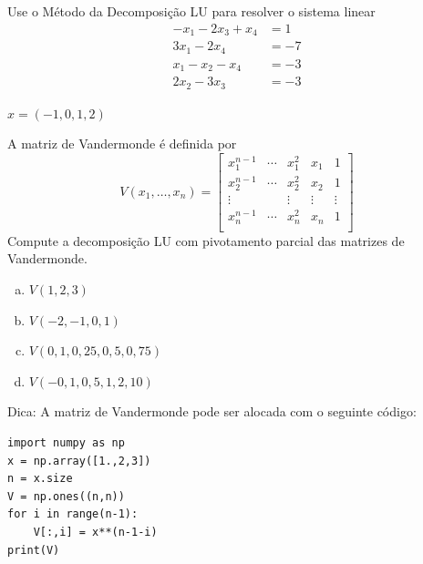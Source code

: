 \begin{exer}
  Use o Método da Decomposição LU para resolver o sistema linear
  \begin{align}
    -x_1 - 2x_3 + x_4 &= 1\\
    3x_1 - 2x_4 &= -7\\
    x_1 - x_2 - x_4 &= -3\\
    2x_2 - 3x_3 &= -3
  \end{align}
\end{exer}
\begin{resp}
  $x = (-1, 0, 1, 2)$
\end{resp}

\begin{exer}
  A matriz de Vandermonde{\vandermonde} é definida por
  \begin{equation}
    V(x_1,\ldots,x_n) =
    \begin{bmatrix}
      x_1^{n-1} & \cdots  & x_1^2 & x_1 & 1\\
      x_2^{n-1} & \cdots  & x_2^2 & x_2 & 1\\
      \vdots   &         & \vdots & \vdots & \vdots\\
      x_n^{n-1} & \cdots  & x_n^2 & x_n & 1\\
    \end{bmatrix}
  \end{equation}
  Compute a decomposição LU com pivotamento parcial das matrizes de Vandermonde.
  \begin{enumerate}[a)]
  \item $V(1,2,3)$\\
  \item $V(-2,-1,0,1)$\\
  \item $V(0,1, 0,25, 0,5, 0,75)$\\
  \item $V(-0,1, 0,5, 1, 2, 10)$
  \end{enumerate}
\end{exer}
\begin{resp}
  Dica: A matriz de Vandermonde pode ser alocada com o seguinte código:
\begin{lstlisting}
import numpy as np
x = np.array([1.,2,3])
n = x.size
V = np.ones((n,n))
for i in range(n-1):
    V[:,i] = x**(n-1-i)
print(V)
\end{lstlisting}
\end{resp}

